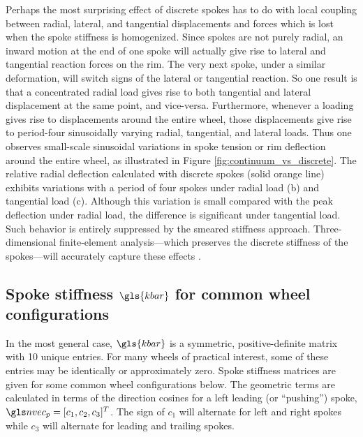 \documentclass[\rootdir/thesis.tex]{subfiles}
\begin{document}
Perhaps the most surprising effect of discrete spokes has to do with local coupling between radial, lateral, and tangential displacements and forces which is lost when the spoke stiffness is homogenized. Since spokes are not purely radial, an inward motion at the end of one spoke will actually give rise to lateral and tangential reaction forces on the rim. The very next spoke, under a similar deformation, will switch signs of the lateral or tangential reaction. So one result is that a concentrated radial load gives rise to both tangential and lateral displacement at the same point, and vice-versa. Furthermore, whenever a loading gives rise to displacements around the entire wheel, those displacements give rise to period-four sinusoidally varying radial, tangential, and lateral loads. Thus one observes small-scale sinusoidal variations in spoke tension or rim deflection around the entire wheel, as illustrated in Figure \ref{fig:continuum_vs_discrete}. The relative radial deflection calculated with discrete spokes (solid orange line) exhibits variations with a period of four spokes under radial load (b) and tangential load (c). Although this variation is small compared with the peak deflection under radial load, the difference is significant under tangential load. Such behavior is entirely suppressed by the smeared stiffness approach. Three-dimensional finite-element analysis---which preserves the discrete stiffness of the spokes---will accurately capture these effects \cite{Salamon1992}.

\subsection{Spoke stiffness $\gls{kbar}$ for common wheel configurations}

In the most general case, $\gls{kbar}$ is a symmetric, positive-definite matrix with 10 unique entries. For many wheels of practical interest, some of these entries may be identically or approximately zero. Spoke stiffness matrices are given for some common wheel configurations below. The geometric terms are calculated in terms of the direction cosines for a left leading (or ``pushing'') spoke, $\n_p = [c_1, c_2, c_3]^T$. The sign of $c_1$ will alternate for left and right spokes while $c_3$ will alternate for leading and trailing spokes.
\end{document}

